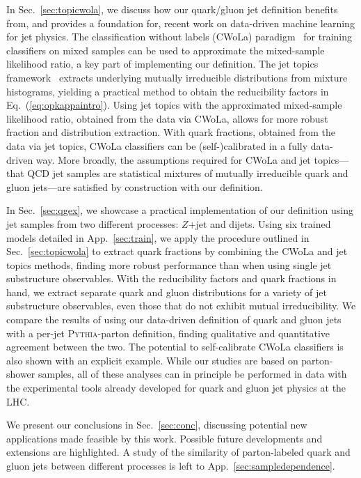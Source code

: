 \documentclass[letterpaper,11pt]{article}
\DeclareRobustCommand{\Sec}[1]{Sec.~\ref{#1}}
\DeclareRobustCommand{\App}[1]{App.~\ref{#1}}
\DeclareRobustCommand{\Eq}[1]{Eq.~(\ref{#1})}
\newcommand{\pythia}{\textsc{Pythia}\xspace}
\begin{document}
In \Sec{sec:topicwola}, we discuss how our quark/gluon jet definition benefits from, and provides a foundation for, recent work on data-driven machine learning for jet physics.
%
The classification without labels (CWoLa) paradigm~\cite{Metodiev:2017vrx} for training classifiers on mixed samples can be used to approximate the mixed-sample likelihood ratio, a key part of implementing our definition.
%
The jet topics framework~\cite{Metodiev:2018ftz} extracts underlying mutually irreducible distributions from mixture histograms, yielding a practical method to obtain the reducibility factors in \Eq{eq:opkappaintro}.
%
Using jet topics with the approximated mixed-sample likelihood ratio, obtained from the data via CWoLa, allows for more robust fraction and distribution extraction.
%
With quark fractions, obtained from the data via jet topics, CWoLa classifiers can be (self-)calibrated in a fully data-driven way.
%
More broadly, the assumptions required for CWoLa and jet topics---that QCD jet samples are statistical mixtures of mutually irreducible quark and gluon jets---are satisfied by construction with our definition.


In \Sec{sec:qgex}, we showcase a practical implementation of our definition using jet samples from two different processes: $Z$+jet and dijets.
%
Using six trained models detailed in \App{sec:train}, we apply the procedure outlined in \Sec{sec:topicwola} to extract quark fractions by combining the CWoLa and jet topics methods, finding more robust performance than when using single jet substructure observables.
%
With the reducibility factors and quark fractions in hand, we extract separate quark and gluon distributions for a variety of jet substructure observables, even those that do not exhibit mutual irreducibility.
%
We compare the results of using our data-driven definition of quark and gluon jets with a per-jet \pythia-parton definition, finding qualitative and quantitative agreement between the two.
%
The potential to self-calibrate CWoLa classifiers is also shown with an explicit example.
%
While our studies are based on parton-shower samples, all of these analyses can in principle be performed in data with the experimental tools already developed for quark and gluon jet physics at the LHC.


We present our conclusions in \Sec{sec:conc}, discussing potential new applications made feasible by this work.
%
Possible future developments and extensions are highlighted.
%
A study of the similarity of parton-labeled quark and gluon jets between different processes is left to \App{sec:sampledependence}.
\end{document}
